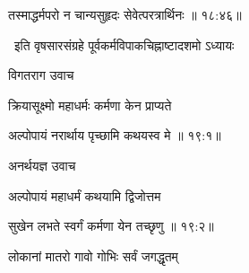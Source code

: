 

\nemslokad

{\devanagarifont तस्माद्धर्मपरो न चान्यसुहृदः सेवेत्परत्रार्थिनः {॥ १८:४६॥} \veg\dontdisplaylinenum }%

\vers


{\devanagarifont 
\jump
\begin{center}
\ketdanda~इति वृषसारसंग्रहे पूर्वकर्मविपाकचिह्नाष्टादशमो ऽध्यायः~\ketdanda
\end{center}
\dontdisplaylinenum\vers  }%
\bekveg\szamveg
\vfill
\phpspagebreak

\thispagestyle{empty}

\centerline{\Large\devanagarifontbold [   एकोनविंशतिमो ऽध्यायः  ]}{\vrule depth10pt width0pt} 
\fancyhead[LE]{}
\fancyhead[RE]{}
\fancyhead[LO]{}
\fancyhead[RO]{}
\szam\bek



\vers


{\devanagarifont विगतराग उवाच {\dandab}\dontdisplaylinenum  }%
 
{\devanagarifont क्रियासूक्ष्मो महाधर्मः कर्मणा केन प्राप्यते \thinspace{\danda} \dontdisplaylinenum }%
 

{\devanagarifont अल्पोपायं नरार्थाय पृच्छामि कथयस्व मे {॥ १९:१॥} \veg\dontdisplaylinenum }%
 
{\devanagarifont अनर्थयज्ञ उवाच {\dandab}\dontdisplaylinenum  }%
 
{\devanagarifont अल्पोपायं महाधर्मं कथयामि द्विजोत्तम \thinspace{\danda} \dontdisplaylinenum }%


{\devanagarifont सुखेन लभते स्वर्गं कर्मणा येन तच्छृणु {॥ १९:२॥} \veg\dontdisplaylinenum }%
 
{\devanagarifont लोकानां मातरो गावो गोभिः सर्वं जगद्धृतम् \thinspace{\dandab} \dontdisplaylinenum }%

